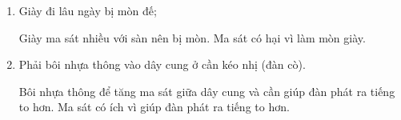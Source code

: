 \begin{enumerate}[label=\bfseries Câu \arabic*:]
{\begin{enumerate}
			Bánh xe không có ma sát với mặt đường, hoặc ma sát rất nhỏ không đủ để ô tô tiến lên. Ma sát có ích, giúp ô tô di chuyển được.
			
			\item Giày đi lâu ngày bị mòn đế;
			
			Giày ma sát nhiều với sàn nên bị mòn. Ma sát có hại vì làm mòn giày.
			
			\item Phải bôi nhựa thông vào dây cung ở cần kéo nhị (đàn cò).
			
			Bôi nhựa thông để tăng ma sát giữa dây cung và cần giúp đàn phát ra tiếng to hơn. Ma sát có ích vì giúp đàn phát ra tiếng to hơn.
		\end{enumerate}
	}
\end{enumerate}